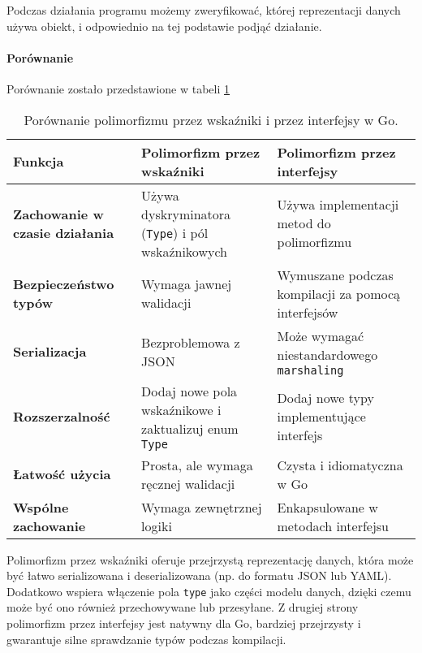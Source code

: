 Podczas działania programu możemy zweryfikować, której reprezentacji danych używa obiekt, i odpowiednio na tej podstawie podjąć działanie.

\paragraph{Porównanie}

Porównanie zostało przedstawione w tabeli \ref{tab:431}

\begin{table}[h!]
\centering
\renewcommand{\arraystretch}{1.5} %
\begin{tabular}{|p{4cm}|p{5.5cm}|p{5.5cm}|}
\hline
\textbf{Funkcja}               & \textbf{Polimorfizm przez wskaźniki}                                   & \textbf{Polimorfizm przez interfejsy}                          \\ \hline
\textbf{Zachowanie w czasie działania} & Używa dyskryminatora (\texttt{Type}) i pól wskaźnikowych           & Używa implementacji metod do polimorfizmu                     \\ \hline
\textbf{Bezpieczeństwo typów}      & Wymaga jawnej walidacji                                              & Wymuszane podczas kompilacji za pomocą interfejsów            \\ \hline
\textbf{Serializacja}          & Bezproblemowa z JSON                                                 & Może wymagać niestandardowego \texttt{marshaling}             \\ \hline
\textbf{Rozszerzalność}        & Dodaj nowe pola wskaźnikowe i zaktualizuj enum \texttt{Type}          & Dodaj nowe typy implementujące interfejs                      \\ \hline
\textbf{Łatwość użycia}         & Prosta, ale wymaga ręcznej walidacji                                 & Czysta i idiomatyczna w Go                                    \\ \hline
\textbf{Wspólne zachowanie}    & Wymaga zewnętrznej logiki                                            & Enkapsulowane w metodach interfejsu                           \\ \hline
\end{tabular}
\caption{Porównanie polimorfizmu przez wskaźniki i przez interfejsy w Go.}\label{tab:431}
\end{table}

Polimorfizm przez wskaźniki oferuje przejrzystą reprezentację danych, która może być łatwo serializowana i deserializowana (np. do formatu JSON lub YAML). Dodatkowo wspiera włączenie pola \texttt{type} jako części modelu danych, dzięki czemu może być ono również przechowywane lub przesyłane. Z drugiej strony polimorfizm przez interfejsy jest natywny dla Go, bardziej przejrzysty i gwarantuje silne sprawdzanie typów podczas kompilacji.

